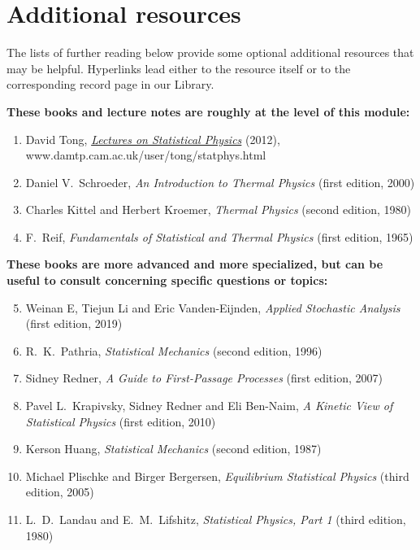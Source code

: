\documentclass[12 pt]{article}
\newcommand{\mutesection}[1]{\vspace{-\medskipamount}\section*{#1}\vspace{-\medskipamount}}
\begin{document}
{%
\mutesection{Additional resources}
The lists of further reading below provide some optional additional resources that may be helpful.
Hyperlinks lead either to the resource itself or to the corresponding record page in our Library.

\noindent\textbf{These books and lecture notes are roughly at the level of this module:} \\[-24 pt]
\begin{enumerate}
  \item David Tong, \href{https://www.damtp.cam.ac.uk/user/tong/statphys.html}{\textit{Lectures on Statistical Physics}} (2012), \\ www.damtp.cam.ac.uk/user/tong/statphys.html
  \item Daniel V.~Schroeder, \textit{An Introduction to Thermal Physics} (first edition, 2000)
  \item Charles Kittel and Herbert Kroemer, \textit{Thermal Physics} (second edition, 1980)
  \item F.~Reif, \textit{Fundamentals of Statistical and Thermal Physics} (first edition, 1965)
\end{enumerate}

\noindent\textbf{These books are more advanced and more specialized, but can be useful to consult concerning specific questions or topics:} \\[-24 pt]
\begin{enumerate}
  \setcounter{enumi}{4}
  \item Weinan E, Tiejun Li and Eric Vanden-Eijnden, \textit{Applied Stochastic Analysis} (first edition, 2019)
  \item R.~K.~Pathria, \textit{Statistical Mechanics} (second edition, 1996)
  \item Sidney Redner, \textit{A Guide to First-Passage Processes} (first edition, 2007)
  \item Pavel L.~Krapivsky, Sidney Redner and Eli Ben-Naim, \textit{A Kinetic View of Statistical Physics} (first edition, 2010)
  \item Kerson Huang, \textit{Statistical Mechanics} (second edition, 1987)
  \item Michael Plischke and Birger Bergersen, \textit{Equilibrium Statistical Physics} (third edition, 2005)
  \item L.~D.~Landau and E.~M.~Lifshitz, \textit{Statistical Physics, Part 1} (third edition, 1980)
\end{enumerate}

}
\end{document}
